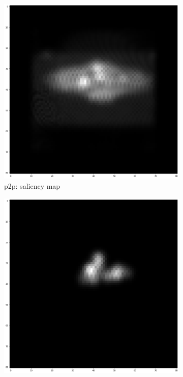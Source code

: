 \begin{figure}
\begin{subfigure}[t]{0.16\linewidth}
    \end{subfigure}
    \hfill
    \begin{subfigure}[t]{0.16\linewidth}
        \centering
        \includegraphics[width=\textwidth]{figures/methods7.png}
        \caption{p2p: saliency map}
        \label{methods:pic7}
    \end{subfigure}
    \hfill
    \begin{subfigure}[t]{0.16\linewidth}
        \centering
        \includegraphics[width=\textwidth]{figures/methods8.png}

\end{subfigure}
\end{figure}

